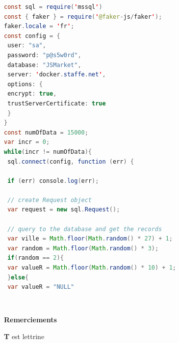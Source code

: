 \documentclass{rapportHenallux}
\begin{document}
\begin{lstlisting}[language=Java, title=test.sql]
const sql = require('mssql')
const { faker } = require('@faker-js/faker');
faker.locale = 'fr';
const config = {
 user: "sa",
 password: "p@s5w0rd",
 database: "JSMarket",
 server: 'docker.staffe.net',
 options: {
 encrypt: true,
 trustServerCertificate: true
 }
}
const numOfData = 15000;
var incr = 0;
while(incr != numOfData){
 sql.connect(config, function (err) {
 
 if (err) console.log(err);
 
 // create Request object
 var request = new sql.Request();
 
 // query to the database and get the records
 var ville = Math.floor(Math.random() * 27) + 1;
 var random = Math.floor(Math.random() * 3);
 if(random == 2){
 var valueR = Math.floor(Math.random() * 10) + 1;
 }else{
 var valueR = "NULL"
\end{lstlisting}
\newpage \thispagestyle{empty}
~~
\vspace{150px}

{\fontsize{24}{25}\selectfont \textbf{Remerciements}}
\vspace{10px}

\lettrine[findent=2pt]{\textbf{T}}{ }est lettrine 

\tabto{6cm} \lipsum[2-3]

\fairebibliographie

\newpage \listoffigures

\end{document}
